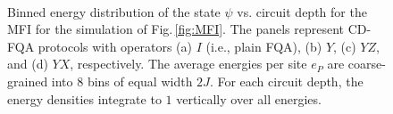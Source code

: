 \documentclass[twocolumn,aps,superscriptaddress,floatfix,longbibliography]{revtex4-2}
\newcommand{\Fig}[1]{Fig.\,\ref{fig:#1}}
\def\YX{\ensuremath{\mathit{YX}}\xspace} %
\def\YZ{\ensuremath{\mathit{YZ}}\xspace}
\begin{document}
\begin{figure}
    \centering
    \\
\caption{
   Binned energy distribution %
   of the state $\psi$  vs. circuit depth for the MFI
   for the simulation of \Fig{MFI}.
   The panels %
   represent CD-FQA protocols with operators
      (a) $I$ (i.e., plain FQA),
      (b) $Y$,
      (c) \YZ, and
      (d) \YX, respectively.
   The average energies per site $e_P$
   are coarse-grained %
   into 8 bins of equal width %
   $2J$. For each circuit depth,
   the energy densities integrate to $1$ vertically
   over all energies.}
\label{fig:MFIcolor}
\end{figure}
\end{document}
